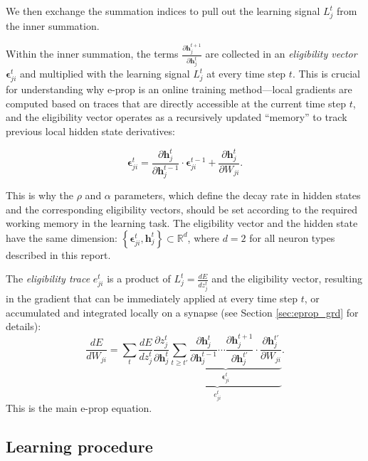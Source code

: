         We then exchange the summation indices to pull out the learning signal $L_j^t$ from the inner summation.

        Within the inner summation, the terms $\frac{\partial\mathbf{h}_j^{t+1}}{\partial\mathbf{h}_j^t}$ are collected in an \emph{eligibility vector} $\mathbf{\epsilon}^t_{ji}$ and multiplied with the learning signal $L^t_j$ at every time step $t$.
        This is crucial for understanding why e-prop is an online training method---local gradients are computed based on traces that are directly accessible at the current time step $t$, and the eligibility vector operates as a recursively updated ``memory'' to track previous local hidden state derivatives:

        \begin{equation}
        \mathbf{\epsilon}^t_{ji} = \frac{\partial\mathbf{h}_j^{t}}{\partial\mathbf{h}_j^{t-1}}\cdot\mathbf{\epsilon}^{t-1}_{ji} + \frac{\partial\mathbf{h}^t_j}{\partial W_{ji}}.
        \end{equation}

        This is why the $\rho$ and $\alpha$ parameters, which define the decay rate in hidden states and the corresponding eligibility vectors, should be set according to the required working memory in the learning task.
        The eligibility vector and the hidden state have the same dimension: $\left\{\mathbf{\epsilon}^t_{ji}, \mathbf{h}^t_j\right\} \subset \mathbb{R}^d$, where $d=2$ for all neuron types described in this report.

        The \emph{eligibility trace} $e^t_{ji}$ is a product of $L^t_j = \frac{dE}{dz_j^t}$ and the eligibility vector, resulting in the gradient that can be immediately applied at every time step $t$, or accumulated and integrated locally on a synapse (see Section \ref{sec:eprop_grd} for details):
        \begin{equation}
        \frac{dE}{dW_{ji}} = \sum_t\frac{dE}{dz_j^t}\underbrace{\frac{\partial z_j^t}{\partial\mathbf{h}_j^t}\underbrace{\sum_{t\geq t'}\frac{\partial\mathbf{h}^t_j}{\partial\mathbf{h}_j^{t-1}} \cdots \frac{\partial\mathbf{h}_j^{t+1}}{\partial\mathbf{h}_j^{t'}}\cdot\frac{\partial\mathbf{h}_j^{t'}}{\partial W_{ji}}}_{\mathbf{\epsilon}_{ji}^t}}_{e^t_{ji}}.
        \end{equation}
        This is the main e-prop equation.

    \subsection{Learning procedure}

